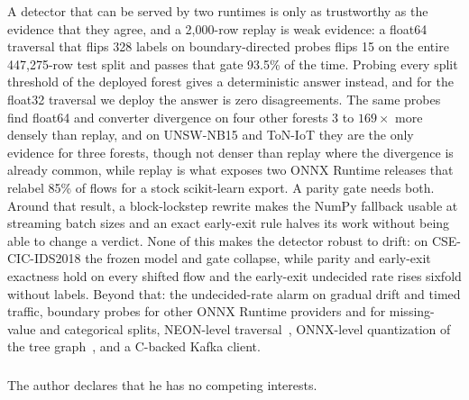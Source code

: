 \documentclass[runningheads]{llncs}
\begin{document}
A detector that can be served by two runtimes is only as trustworthy as the evidence that they agree, and a 2{,}000-row replay is weak evidence: a float64 traversal that flips 328 labels on boundary-directed probes flips 15 on the entire 447{,}275-row test split and passes that gate 93.5\% of the time. Probing every split threshold of the deployed forest gives a deterministic answer instead, and for the float32 traversal we deploy the answer is zero disagreements. The same probes find float64 and converter divergence on four other forests 3 to $169\times$ more densely than replay, and on UNSW-NB15 and ToN-IoT they are the only evidence for three forests, though not denser than replay where the divergence is already common, while replay is what exposes two ONNX Runtime releases that relabel 85\% of flows for a stock scikit-learn export. A parity gate needs both. Around that result, a block-lockstep rewrite makes the NumPy fallback usable at streaming batch sizes and an exact early-exit rule halves its work without being able to change a verdict. None of this makes the detector robust to drift: on CSE-CIC-IDS2018 the frozen model and gate collapse, while parity and early-exit exactness hold on every shifted flow and the early-exit undecided rate rises sixfold without labels. Beyond that: the undecided-rate alarm on gradual drift and timed traffic, boundary probes for other ONNX Runtime providers and for missing-value and categorical splits, NEON-level traversal~\cite{koschel2023arm}, ONNX-level quantization of the tree graph~\cite{eren2026drdos}, and a C-backed Kafka client.

\begin{credits}
\subsubsection{\discintname}
The author declares that he has no competing interests.
\end{credits}



\end{document}
